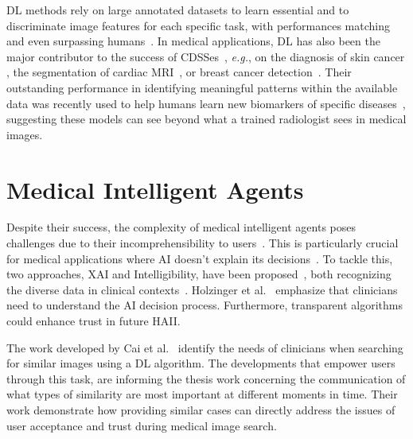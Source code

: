 
\ac{DL} methods rely on large annotated datasets to learn essential and to discriminate image features for each specific task, with performances matching and even surpassing humans~\cite{McKinney2020}.
In medical applications, \ac{DL} has also been the major contributor to the success of \acp{CDSSe}~\cite{esteva2019guide}, {\it e.g.}, on the diagnosis of skin cancer \cite{esteva2017dermatologist}, the segmentation of cardiac \ac{MRI}~\cite{medley2019segmenting}, or breast cancer detection~\cite{MAICAS2019101562}.
Their outstanding performance in identifying meaningful patterns within the available data was recently used to help humans learn new biomarkers of specific diseases~\cite{McKinney2020}, suggesting these models can see beyond what a trained radiologist sees in medical images.

\section{Medical Intelligent Agents}
\label{sec:chap003004}

Despite their success, the complexity of medical intelligent agents poses challenges due to their incomprehensibility to users~\cite{holzinger2019causability}. This is particularly crucial for medical applications where \ac{AI} doesn't explain its decisions~\cite{shah2019artificial}.
To tackle this, two approaches, \ac{XAI} and Intelligibility, have been proposed~\cite{gunning2017explainable}, both recognizing the diverse data in clinical contexts~\cite{Bharadhwaj:2019:ERS:3308557.3308699}.
Holzinger et al.~\cite{holzinger2018current} emphasize that clinicians need to understand the \ac{AI} decision process.
Furthermore, transparent algorithms could enhance trust in future \ac{HAII}\cite{Dominguez:2019:EEA:3301275.3302274, Weisz:2019:BTS:3301275.3302290}.

The work developed by Cai et al.~\cite{10.1145/3290605.3300234} identify the needs of clinicians when searching for similar images using a \ac{DL} algorithm.
The developments that empower users through this task, are informing the thesis work concerning the communication of what types of similarity are most important at different moments in time.
Their work demonstrate how providing similar cases can directly address the issues of user acceptance and trust during medical image search.

